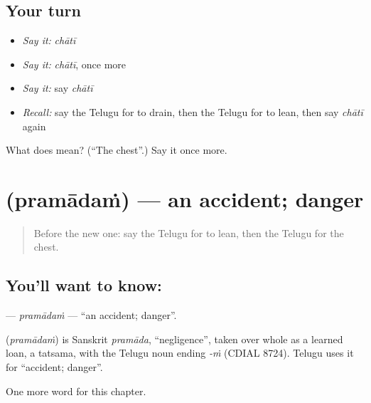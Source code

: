 \subsection*{Your turn}
\begin{itemize}
\raggedright
  \item \emph{Say it:} \emph{chātī}
  \item \emph{Say it:} \emph{chātī}, once more
  \item \emph{Say it:} say \emph{chātī}
  \item \emph{Recall:} say the Telugu for to drain, then the Telugu for to lean, then say \emph{chātī} again
\end{itemize}

\begin{tcolorbox}[breakable,colback=teal!4,colframe=teal!35!black,title={Before you move on}]
What does  mean? (\textquotedblleft{}The chest\textquotedblright{}.) Say it once more.
\end{tcolorbox}
\section[\texorpdfstring{\te{ప్రమాదం} (pramādaṁ)}{ప్రమాదం (pramādaṁ)}]{ (pramādaṁ) — an accident; danger}

\label{lesson:TE-C287-pramadam}



\begin{quote}
Before the new one: say the Telugu for to lean, then the Telugu for the chest.
\end{quote}

\subsection*{You'll want to know: }
\textbf{} — \emph{pramādaṁ} — \textquotedblleft{}an accident; danger\textquotedblright{}.

\begin{cousinweb}
\textbf{} (\emph{pramādaṁ}) is Sanskrit \emph{pramāda}, \textquotedblleft{}negligence\textquotedblright{}, taken over whole as a learned loan, a tatsama, with the Telugu noun ending \emph{-ṁ} (CDIAL 8724). Telugu uses it for \textquotedblleft{}accident; danger\textquotedblright{}.
\end{cousinweb}

\begin{grammarlens}[title={What you've built}]
One more word for this chapter.
\end{grammarlens}

